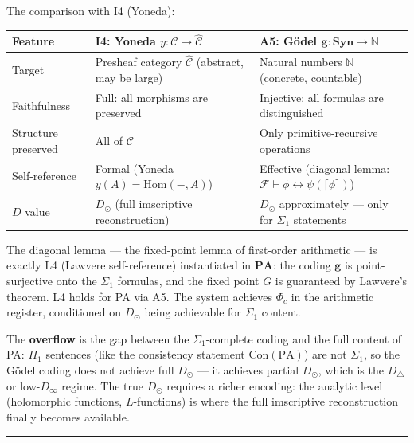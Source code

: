 \documentclass[12pt,a4paper]{article}
\begin{document}
The comparison with I4 (Yoneda):

\begin{table}[htbp]
\centering
\small
{}
\begin{tabularx}{\textwidth}{>{\centering\arraybackslash}X >{\centering\arraybackslash}X >{\centering\arraybackslash}X}
\toprule
\rowcolor{gray!25}\textbf{Feature} & \textbf{I4: Yoneda $y: \mathcal{C} \to \hat{\mathcal{C}}$} & \textbf{A5: G\"odel $\mathbf{g}: \mathbf{Syn} \to \mathbb{N}$} \\
\midrule
\rowcolors{1}{white}{gray!10}
Target & Presheaf category $\hat{\mathcal{C}}$ (abstract, may be large) & Natural numbers $\mathbb{N}$ (concrete, countable) \\
Faithfulness & Full: all morphisms are preserved & Injective: all formulas are distinguished \\
Structure preserved & All of $\mathcal{C}$ & Only primitive-recursive operations \\
Self-reference & Formal (Yoneda $y(A) = \text{Hom}(-,A)$) & Effective (diagonal lemma: $\mathcal{F} \vdash \phi \leftrightarrow \psi(\lceil \phi \rceil)$) \\
$D$ value & $D_{\odot}$ (full imscriptive reconstruction) & $D_{\odot}$ approximately --- only for $\Sigma_1$ statements \\
\bottomrule
\end{tabularx}
\end{table}

The diagonal lemma --- the fixed-point lemma of first-order arithmetic --- is exactly L4 (Lawvere self-reference) instantiated in $\mathbf{PA}$: the coding $\mathbf{g}$ is point-surjective onto the $\Sigma_1$ formulas, and the fixed point $G$ is guaranteed by Lawvere's theorem. L4 holds for PA via A5. The system achieves $\Phi_c$ in the arithmetic register, conditioned on $D_{\odot}$ being achievable for $\Sigma_1$ content.

The \textbf{overflow} is the gap between the $\Sigma_1$-complete coding and the full content of PA: $\Pi_1$ sentences (like the consistency statement $\text{Con}(\text{PA})$) are not $\Sigma_1$, so the G\"odel coding does not achieve full $D_{\odot}$ --- it achieves partial $D_{\odot}$, which is the $D_{\triangle}$ or low-$D_{\infty}$ regime. The true $D_{\odot}$ requires a richer encoding: the analytic level (holomorphic functions, $L$-functions) is where the full imscriptive reconstruction finally becomes available.\begin{center}
\rule{0.5\textwidth}{0.4pt}
\end{center}
\end{document}
